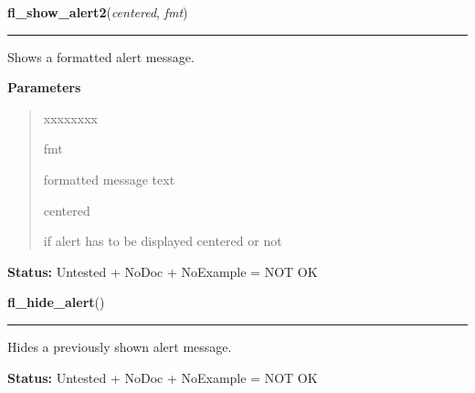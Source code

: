     \label{xformslib:library:fl_show_alert2}

    \vspace{0.5ex}

\hspace{.8\funcindent}\begin{boxedminipage}{\funcwidth}

    \raggedright \textbf{fl\_show\_alert2}(\textit{centered}, \textit{fmt})

    \vspace{-1.5ex}

    \rule{\textwidth}{0.5\fboxrule}
\setlength{\parskip}{2ex}
    Shows a formatted alert message.

\setlength{\parskip}{1ex}
      \textbf{Parameters}
      \vspace{-1ex}

      \begin{quote}
        \begin{Ventry}{xxxxxxxx}

          \item[fmt]

          formatted message text

          \item[centered]

          if alert has to be displayed centered or not

        \end{Ventry}

      \end{quote}

\textbf{Status:} Untested + NoDoc + NoExample = NOT OK



    \end{boxedminipage}

    \label{xformslib:library:fl_hide_alert}

    \vspace{0.5ex}

\hspace{.8\funcindent}\begin{boxedminipage}{\funcwidth}

    \raggedright \textbf{fl\_hide\_alert}()

    \vspace{-1.5ex}

    \rule{\textwidth}{0.5\fboxrule}
\setlength{\parskip}{2ex}
    Hides a previously shown alert message.

\setlength{\parskip}{1ex}
\textbf{Status:} Untested + NoDoc + NoExample = NOT OK



    \end{boxedminipage}

